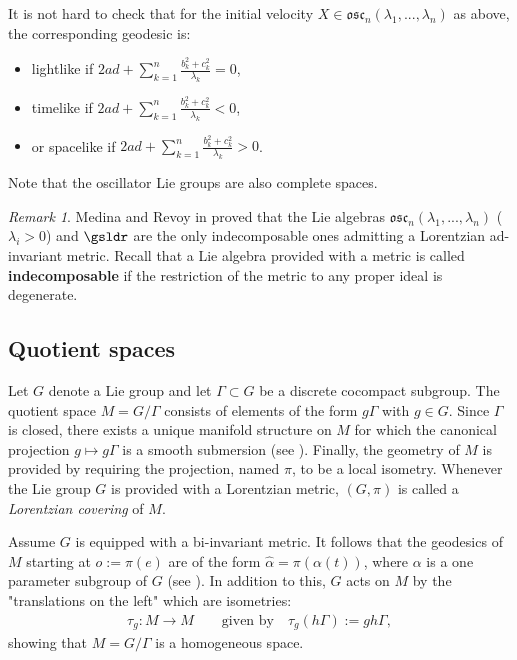 \documentclass[12pt]{amsart}
\theoremstyle{plain}
\theoremstyle{definition}
\theoremstyle{remark}
\newtheorem{rem}{Remark}
\begin{document}
	It is not hard to check that for the initial velocity $X \in \mathfrak{osc}_n(\lambda_1,...,\lambda_n)$ as above, the corresponding geodesic is:
	\begin{itemize}
		\item lightlike if $2 a d + \sum_{k=1}^{n} \frac{b_k^2+c_k^2}{\lambda_k} = 0$,
		\item timelike if $2 a d + \sum_{k=1}^{n} \frac{b_k^2+c_k^2}{\lambda_k} < 0$, 
		\item or spacelike if $2 a d + \sum_{k=1}^{n} \frac{b_k^2+c_k^2}{\lambda_k} > 0$.
	\end{itemize}
	
	Note that the oscillator  Lie groups are also complete spaces. 
	
	\smallskip
	
	\begin{rem} Medina and Revoy  in \cite{Me,MeRe} proved that the Lie algebras $\mathfrak{osc}_n(\lambda_1,...,\lambda_n)$ ($\lambda_i > 0$) and $\gsldr$ are the only indecomposable ones admitting a Lorentzian ad-invariant metric. Recall that a Lie algebra provided with a metric is called \textbf{indecomposable} if the restriction of the metric to any proper ideal is degenerate. 
	\end{rem}
	
	
	\subsection{Quotient spaces} 
	
Let $G$ denote a Lie group and let  $\Gamma\subset G$ be a discrete cocompact subgroup. 	The quotient space $M=G/\Gamma$ consists of elements of the form $g\Gamma$ with $g \in G$. Since $\Gamma$ is closed, there exists a unique manifold structure on $M$ for which the canonical projection $g \mapsto g\Gamma$ is a smooth submersion (see \cite{Hel}). Finally, the geometry of $M$ is provided by requiring the projection, named $\pi$, to be a local isometry. Whenever the Lie group  $G$ is provided with a Lorentzian metric, $(G,\pi)$ is called  a \textit{Lorentzian covering} of $M$.
	
	
	
Assume $G$ is equipped with a bi-invariant metric. It follows  that the geodesics of $M$ starting at $o:=\pi(e)$ are of the form $\hat{\alpha}=\pi(\alpha(t))$, where $\alpha$ is a one parameter subgroup of $G$ (see \cite{ON}). In addition to this, $G$ acts on $M$ by the "translations on the left" which are isometries:
	\begin{eqnarray*}
		\tau_g : M \rightarrow M\qquad \mbox{given by} \quad 
		\tau_g(h\Gamma):=gh\Gamma,
	\end{eqnarray*}
	 showing that $M=G/\Gamma$ is a homogeneous space. 
	
\end{document}
